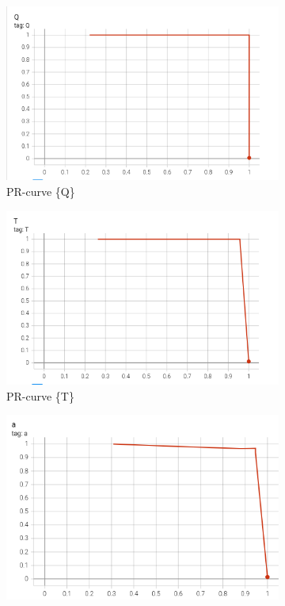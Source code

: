 \begin{figure}[htbp]
    \centering
    \begin{subfigure}[t]{0.32\textwidth}
        \centering
        \includegraphics[width=\textwidth]{images/pr_curve1.png}
        \caption{PR-curve \{Q\}}
    \end{subfigure}
    \begin{subfigure}[t]{0.32\textwidth}
        \centering
        \includegraphics[width=\textwidth]{images/pr_curve2.png}
        \caption{PR-curve \{T\}}
    \end{subfigure}
    \begin{subfigure}[t]{0.32\textwidth}
        \centering
        \includegraphics[width=\textwidth]{images/pr_curve3.png}

\end{subfigure}
\end{figure}
